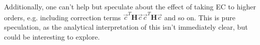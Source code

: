 \documentclass[%
 reprint,
 amsmath,amssymb,
 aps,
]{revtex4-2}
\begin{document}
Additionally, one can't help but speculate about the effect of taking \ac{EC} to higher orders, e.g. including correction terms $\vec{c}^T \mathbf{H} \vec{c} \vec{c}^T \mathbf{H} \vec{c}$ and so on. This is pure speculation, as the analytical interpretation of this isn't immediately clear, but could be interesting to explore.


\end{document}
